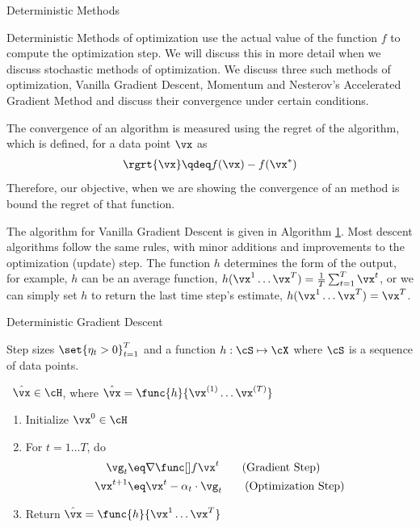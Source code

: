 \documentclass{article}
\begin{document}
\begin{psection}{Deterministic Methods}

	Deterministic Methods of optimization use the actual value of the function $f$ to compute the optimization step. We will discuss this in more detail when we discuss stochastic methods of optimization. We discuss three such methods of optimization, Vanilla Gradient Descent, Momentum and Nesterov's Accelerated Gradient Method and discuss their convergence under certain conditions.

	The convergence of an algorithm is measured using the regret of the algorithm, which is defined, for a data point $\vx$ as
	\begin{align*}
		\rgrt{\vx} \qdeq f(\vx) - f(\xs)
	\end{align*}
	Therefore, our objective, when we are showing the convergence of an method is bound the regret of that function.

	The algorithm for Vanilla Gradient Descent is given in Algorithm \hyperlink{algo:1}{1}. Most descent algorithms follow the same rules, with minor additions and improvements to the optimization (update) step. The function $h$ determines the form of the output, for example, $h$ can be an average function, \ie $h(\x{1} \dots \x{T}) = \frac{1}{T} \sum_{t = 1}^T \vx^t$, or we can simply set $h$ to return the last time step's estimate, \ie $h(\x{1} \dots \x{T}) = \x{T}$.

	\begin{algo}[0.9\textwidth]{Deterministic Gradient Descent}

		 \quad Step sizes $\set{\eta_t > 0}_{t = 1}^T$ and a function $h : \cS \mapsto \cX $ where $\cS$ is a sequence of data points. \sbr

		\, $\hat{\vx} \in \cH$, where $\hat{\vx} = \func{h}{\vx^{(1)} \dots \vx^{(T)}}$ \sbr


		\begin{enumerate}
			\item Initialize $\x{0} \in \cH$
			\item For $t = 1 \dots T$, do
				\begin{align}
					\vg_t		&\eq	\gf{t}							\tag{Gradient Step}		\\
					\x{t + 1}	&\eq	\x{t} - \alpha_t \cdot \vg_t	\tag{Optimization Step}
				\end{align}
			\item Return $\hat{\vx} = \func{h}{\x{1} \dots \x{T}}$
		\end{enumerate}


\end{algo}
\end{psection}
\end{document}
